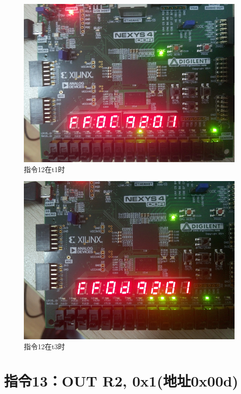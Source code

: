 \documentclass[forprint]{WHUBachelor}
\begin{document}
\begin{figure}[H]
  \centering
  \includegraphics[width=5in]{figures/download/b0.jpg}
  \caption{指令12在t1时}
  \label{fig:down:b0}
\end{figure}

\begin{figure}[H]
  \centering
  \includegraphics[width=5in]{figures/download/b2.jpg}
  \caption{指令12在t3时}
  \label{fig:down:b2}
\end{figure}


\section{指令13：OUT R2, 0x1(地址0x00d)}
\end{document}
